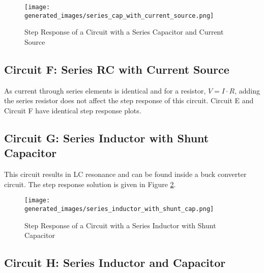 \documentclass[main.tex]{subfiles}
\begin{document}
\begin{figure}[H]
    \centering
    \texttt{[image: generated\_images/series\_cap\_with\_current\_source.png]}
    \caption{Step Response of a Circuit with a Series Capacitor and Current Source}
    \label{fig:step-response-series-cap-with-current-source}
\end{figure}

\subsection{Circuit F: Series RC with Current Source}
As current through series elements is identical and for a resistor, $V = I \cdot R$, adding the series resistor does not affect the step response of this circuit. Circuit E and Circuit F have identical step response plots.

\subsection{Circuit G: Series Inductor with Shunt Capacitor}
This circuit results in LC resonance and can be found inside a buck converter circuit. The step response solution is given in Figure \ref{fig:step-response-series-ind-with-shunt-cap}.

\begin{figure}[H]
    \centering
    \texttt{[image: generated\_images/series\_inductor\_with\_shunt\_cap.png]}
    \caption{Step Response of a Circuit with a Series Inductor with Shunt Capacitor}
    \label{fig:step-response-series-ind-with-shunt-cap}
\end{figure}

\subsection{Circuit H: Series Inductor and Capacitor}


\end{document}
